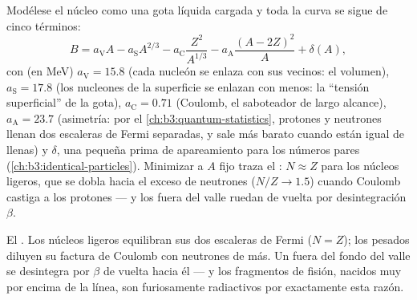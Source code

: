 \begin{proposition}\label{prop:b3:nuclear-physics:semf}
Modélese el núcleo como una gota líquida cargada y toda la curva
se sigue de cinco términos:
\[
B = a_{\text{V}}A - a_{\text{S}}A^{2/3}
- a_{\text{C}}\frac{Z^2}{A^{1/3}}
- a_{\text{A}}\frac{(A - 2Z)^2}{A} + \delta(A) ,
\]
con (en \unit{MeV}) $a_{\text{V}} = 15.8$ (cada nucleón se enlaza con sus
vecinos: el volumen), $a_{\text{S}} = 17.8$ (los nucleones de la superficie se enlazan
con menos: la ``tensión superficial'' de la gota), $a_{\text{C}} = 0.71$
(Coulomb, el saboteador de largo alcance), $a_{\text{A}} = 23.7$
(asimetría: por el \cref{ch:b3:quantum-statistics}, protones y
neutrones llenan dos escaleras de Fermi separadas, y sale más barato cuando están
igual de llenas) y $\delta$, una pequeña prima de apareamiento para los números pares
(\cref{ch:b3:identical-particles}). Minimizar a $A$ fijo traza
el \emph{}: $N \approx Z$ para los núcleos ligeros,
que se dobla hacia el exceso de neutrones ($N/Z \to 1.5$) cuando Coulomb castiga a los protones
--- y los  fuera del valle ruedan de vuelta por desintegración $\beta$.
\end{proposition}
\admitted

\begin{omfigure}

{\small El . Los núcleos ligeros equilibran sus dos
escaleras de Fermi ($N = Z$); los pesados diluyen su factura de Coulomb con
neutrones de más. Un  fuera del fondo del valle se desintegra por $\beta$ de vuelta
hacia él --- y los fragmentos de fisión, nacidos muy por encima de la línea, son
furiosamente radiactivos por exactamente esta razón.}
\end{omfigure}

